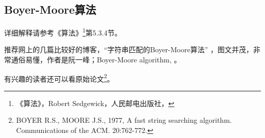 \subsection{Boyer-Moore算法}
详细解释请参考《算法》\footnote{《算法》，Robert Sedgewick，人民邮电出版社，}第5.3.4节。

推荐网上的几篇比较好的博客，“字符串匹配的Boyer-Moore算法” ，图文并茂，非常通俗易懂，作者是阮一峰；Boyer-Moore algorithm, 。

有兴趣的读者还可以看原始论文\footnote{BOYER R.S., MOORE J.S., 1977, A fast string searching algorithm. Communications of the ACM. 20:762-772.}。

